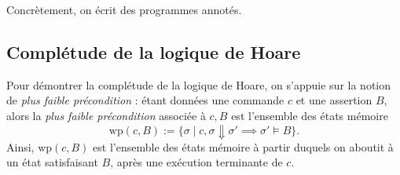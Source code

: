 \documentclass[../main]{subfiles}
\begin{document}
  \begin{rmk}
    Concrètement, on écrit des programmes annotés.
    \begin{figure}[H]
      \centering
    \end{figure}
  \end{rmk}

  \subsection{Complétude de la logique de Hoare}

  Pour démontrer la complétude de la logique de Hoare, on s'appuie sur la notion de \textit{plus faible précondition} : étant données une commande $c$ et une assertion $B$, alors la \textit{plus faible précondition} associée à $c,B$ est  l'ensemble des états mémoire \[
  \mathrm{wp}(c, B) := \{\sigma  \mid c,\sigma \Downarrow \sigma' \implies \sigma' \models B\}
  .\]
  Ainsi, $\mathrm{wp}(c, B)$ est l'ensemble des états mémoire à partir duquels on aboutit à un état satisfaisant $B$, après une exécution terminante de $c$.
\end{document}
